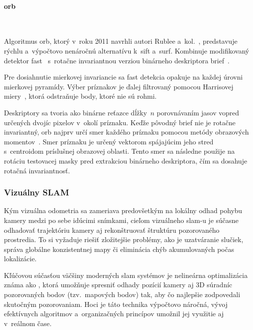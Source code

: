       \paragraph{\acrshort{orb}} \

        \noindent Algoritmus \acrshort{orb}, ktorý v~roku 2011 navrhli autori Rublee a~kol.~\cite{rubleeORBEfficientAlternative2011}, predstavuje rýchlu a~výpočtovo nenáročnú alternatívu k~\acrshort{sift} a~\acrshort{surf}. Kombinuje modifikovaný detektor \acrshort{fast}~\cite{rostenMachineLearningHighSpeed2006} s~rotačne invariantnou verziou binárneho deskriptora \acrshort{brief}~\cite{calonderBRIEFBinaryRobust2010}.

        Pre dosiahnutie mierkovej invariancie sa \acrshort{fast} detekcia opakuje na každej úrovni mierkovej pyramídy. Výber príznakov je ďalej filtrovaný pomocou Harrisovej miery~\cite{harrisCombinedCornerEdge1988}, ktorá odstraňuje body, ktoré nie sú rohmi.

        Deskriptory sa tvoria ako binárne reťazce dĺžky~$n$ porovnávaním jasov vopred určených dvojíc pixelov v~okolí príznaku. Keďže pôvodný \acrshort{brief} nie je rotačne invariantný, \acrshort{orb} najprv určí smer každého príznaku pomocou metódy obrazových momentov~\cite{kletteConciseComputerVision2014}. Smer príznaku je určený vektorom spájajúcim jeho stred s~centroidom príslušnej obrazovej oblasti. Tento smer sa následne použije na rotáciu testovacej masky pred extrakciou binárneho deskriptora, čím sa dosahuje rotačná invariantnosť.

    \subsubsection{Vizuálny SLAM}

      Kým vizuálna odometria sa zameriava predovšetkým na lokálny odhad pohybu kamery medzi po sebe idúcimi snímkami, cieľom vizuálneho \acrshort{slam}-u je súčasne odhadovať trajektóriu kamery aj rekonštruovať štruktúru pozorovaného prostredia. To si vyžaduje riešiť zložitejšie problémy, ako je uzatváranie slučiek, správa globálne konzistentnej mapy či eliminácia chýb akumulovaných počas lokalizácie.

      Kľúčovou súčasťou väčšiny moderných \acrshort{slam} systémov je nelineárna optimalizácia známa ako , ktorá umožňuje spresniť odhady pozícií kamery aj 3D súradníc pozorovaných bodov (tzv.\ mapových bodov) tak, aby čo najlepšie zodpovedali skutočným pozorovaniam. Hoci je táto technika výpočtovo náročná, vývoj efektívnych algoritmov a~organizačných princípov umožnil jej využitie aj v~reálnom čase.

